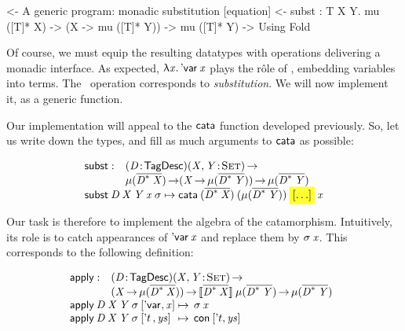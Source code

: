 \begin{wstructure}
<- A generic program: monadic substitution [equation]
    <- subst : \forall T X Y. mu ([T]* X) -> (X -> mu ([T]* Y)) -> mu ([T]* Y)
        -> Using Fold
\end{wstructure}

Of course, we must equip the resulting datatypes with operations
delivering a monadic interface. As expected, \(\LAM{\x}\DVar{\x}\)
plays the r\^ole of \return, embedding variables into terms. The
\bind\ operation corresponds to \emph{substitution}. We will now
implement it, as a generic function.

Our implementation will appeal to the $\cata$ function developed
previously. So, let us write down the types, and fill as much
arguments to $\cata$ as possible:

\newcommand{\subst}{\F{subst}}
\newcommand{\apply}{\F{apply}}

\[\stk{
\begin{array}{@{}ll}
\subst : & \PITEL{\V{D}}{\TagDesc}
           \PI{\V{X}, \V{Y}}{\Set} \\
         & \Mu{(\toDesc{\FreeMonad{\V{D}}{\V{X}}})} \To
           (\V{X} \To \Mu{(\toDesc{\FreeMonad{\V{D}}{\V{Y}}})}) \To
           \Mu{(\toDesc{\FreeMonad{\V{D}}{\V{Y}}})} 
\end{array} \\
\subst\: \V{D}\: \V{X}\: \V{Y}\: \V{x}\: \V{\sigma} \mapsto
  \cata\: (\toDesc{\FreeMonad{\V{D}}{\V{X}}})\: 
          (\Mu{(\toDesc{\FreeMonad{\V{D}}{\V{Y}}})})\: 
          \SHED\: 
          \V{x}
}\]

Our task is therefore to implement the algebra of the
catamorphism. Intuitively, its role is to catch appearances of
$\DVar{\V{x}}$ and replace them by $\V{\sigma}\: \V{x}$. This
corresponds to the following definition:

\[\stk{
\begin{array}{@{}ll}
\apply : & \PITEL{\V{D}}{\TagDesc} 
           \PI{\V{X}, \V{Y}}{\Set} \\
         & (\V{X} \To \Mu{(\toDesc{\FreeMonad{\V{D}}{\V{X}}})}) \To
           \descop{\toDesc{\FreeMonad{\V{D}}{\V{X}}}}{\Mu{(\toDesc{\FreeMonad{\V{D}}{\V{Y}}})}} \To
           \Mu{(\toDesc{\FreeMonad{\V{D}}{\V{Y}}})}
\\
\end{array} \\
\begin{array}{@{}l@{\:\mapsto\:\:}l}
\apply\: \V{D}\: \V{X}\: \V{Y}\: \V{\sigma}\: \pair{\DVar{\!}}{\V{x}}{}   & \V{\sigma}\: \V{x}                   \\
\apply\: \V{D}\: \V{X}\: \V{Y}\: \V{\sigma}\: \pair{\etag{t}\,}{\V{ys}}{} & \Con{\pair{\etag{t}}{\V{ys}}{}}
\end{array}
}\]

